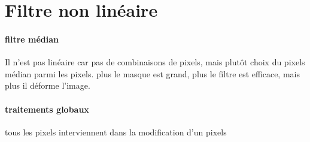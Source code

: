 \documentclass{article}
\begin{document}
\section{Filtre non linéaire}\paragraph{filtre médian} Il n'est pas linéaire car pas de combinaisons de pixels,  mais plutôt choix du pixels médian parmi les pixels. plus le masque est grand, plus le filtre est efficace, mais plus il déforme l'image.
\paragraph{traitements globaux} tous les pixels interviennent dans la modification d'un pixels
\end{document}
